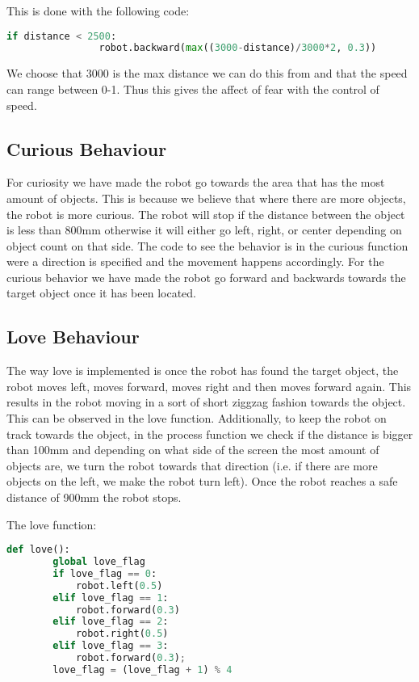 This is done with the following code:

\begin{lstlisting}[language=Python]
            if distance < 2500:
                robot.backward(max((3000-distance)/3000*2, 0.3))
\end{lstlisting}

We choose that 3000 is the max distance we can do this from and that the speed can range between 0-1. Thus this gives the affect of fear with the control of speed.


\subsection{Curious Behaviour}
For curiosity we have made the robot go towards the area that has the most amount of objects. This is because we believe that where there are more objects, the robot is more curious. The robot will stop if the distance between the object is less than 800mm otherwise it will either go left, right, or center depending on object count on that side. The code to see the behavior is in the curious function were a direction is specified and the movement happens accordingly. For the curious behavior we have made the robot go forward and backwards towards the target object once it has been located. 

\subsection{Love Behaviour}
The way love is implemented is once the robot has found the target object, the robot moves left, moves forward, moves right and then moves forward again. This results in the robot moving in a sort of short ziggzag fashion towards the object. This can be observed in the love function. Additionally, to keep the robot on track towards the object, in the process function we check if the distance is bigger than 100mm and depending on what side of the screen the most amount of objects are, we turn the robot towards that direction (i.e. if there are more objects on the left, we make the robot turn left). Once the robot reaches a safe distance of 900mm the robot stops. 

The love function:
\begin{lstlisting}[language=Python]
    def love():
        global love_flag
        if love_flag == 0:
            robot.left(0.5)
        elif love_flag == 1:
            robot.forward(0.3)
        elif love_flag == 2:
            robot.right(0.5)
        elif love_flag == 3:
            robot.forward(0.3);
        love_flag = (love_flag + 1) % 4
\end{lstlisting}

